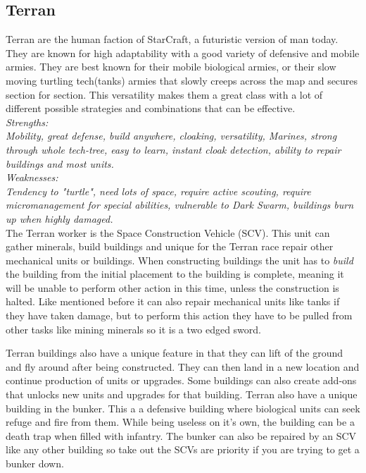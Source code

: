 \subsection{Terran}
Terran are the human faction of StarCraft, a futuristic version of man today. They are known for high adaptability with a good variety of defensive and mobile armies. They are best known for their mobile biological armies, or their slow moving turtling tech(tanks) armies that slowly creeps across the map and secures section for section. This versatility makes them a great class with a lot of different possible strategies and combinations that can be effective. 
\\
\textit{
Strengths: \\
Mobility, great defense, build anywhere, cloaking, versatility, Marines, strong through whole tech-tree, easy to learn, instant cloak detection, ability to repair buildings and most units. \\
Weaknesses: \\
Tendency to "turtle", need lots of space, require active scouting, require micromanagement for special abilities, vulnerable to Dark Swarm, buildings burn up when highly damaged. 
} 
\cite{terranoverview}
\\

The Terran worker is the Space Construction Vehicle (SCV). This unit can gather minerals, build buildings and unique for the Terran race repair other mechanical units or buildings. When constructing buildings the unit has to \textit{build} the building from the initial placement to the building is complete, meaning it will be unable to perform other action in this time, unless the construction is halted. Like mentioned before it can also repair mechanical units like tanks if they have taken damage, but to perform this action they have to be pulled from other tasks like mining minerals so it is a two edged sword. 

Terran buildings also have a unique feature in that they can lift of the ground and fly around after being constructed. They can then land in a new location and continue production of units or upgrades. Some buildings can also create add-ons that unlocks new units and upgrades for that building. Terran also have a unique building in the bunker. This a a defensive building where  biological units can seek refuge and fire from them.  While being useless on it's own, the building can be a death trap when filled with infantry. The bunker can also be repaired by an SCV like any other building so take out the SCVs are priority if you are trying to get a bunker down. 

